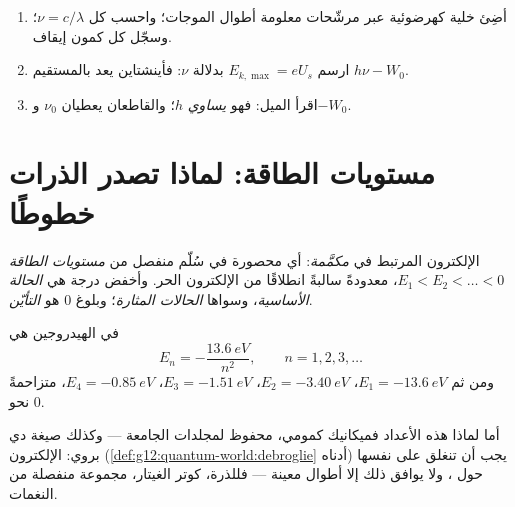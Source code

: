 \begin{method}\label{met:g12:quantum-world:measure-h}
\begin{enumerate}
  \item أضِئ خلية كهرضوئية عبر مرشّحات معلومة أطوال الموجات؛
        واحسب كل $\nu = c/\lambda$؛ وسجّل كل كمون إيقاف.
  \item ارسم $E_{k,\max} = eU_s$ بدلالة $\nu$: فأينشتاين يعد
        بالمستقيم $h\nu - W_0$.
  \item اقرأ الميل: فهو \emph{يساوي} $h$؛ والقاطعان يعطيان $\nu_0$ و$-W_0$.
\end{enumerate}
\end{method}

\section{مستويات الطاقة: لماذا تصدر الذرات خطوطًا}

\begin{definition}\label{def:g12:quantum-world:levels}
 الإلكترون المرتبط في 
\emph{مكمَّمة}: أي محصورة في سُلّم منفصل من
\emph{مستويات الطاقة} $E_1 < E_2 < \dots < 0$، معدودةً
سالبةً انطلاقًا من الإلكترون الحر. وأخفض درجة هي \emph{الحالة
الأساسية}، وسواها \emph{الحالات
المثارة}؛ وبلوغ $0$ هو
\emph{التأيّن}.
\end{definition}

\begin{proposition}[سُلّم الهيدروجين]\label{prop:g12:quantum-world:hydrogen}
 في  الهيدروجين هي
\[
E_n = -\frac{\qty{13.6}{eV}}{n^2}, \qquad n = 1, 2, 3, \dots
\]
ومن ثم $E_1 = \qty{-13.6}{eV}$، $E_2 = \qty{-3.40}{eV}$، $E_3 =
\qty{-1.51}{eV}$، $E_4 = \qty{-0.85}{eV}$، متزاحمةً نحو $0$.
\end{proposition}
\admitted

\begin{remark}\label{rem:g12:quantum-world:ladder-origin}
أما لماذا هذه الأعداد فميكانيك كمومي، محفوظ لمجلدات الجامعة ---
وكذلك صيغة دي بروي:  الإلكترون
(\cref{def:g12:quantum-world:debroglie} أدناه) يجب أن تنغلق على نفسها حول
، ولا يوافق ذلك إلا أطوال  معينة --- فللذرة، كوتر الغيتار،
مجموعة منفصلة من النغمات.
\end{remark}

